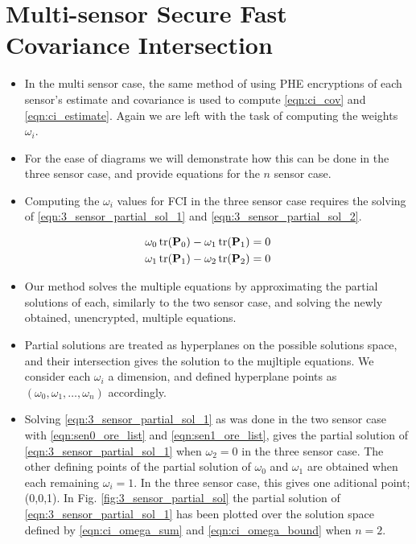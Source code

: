 \documentclass[letterpaper, 10 pt, conference]{ieeeconf}  %
\begin{document}
\section{Multi-sensor Secure Fast Covariance Intersection} \label{sec:multi_secfci}
\begin{itemize}
   \item In the multi sensor case, the same method of using PHE encryptions of each sensor's estimate and covariance is used to compute \eqref{eqn:ci_cov} and \eqref{eqn:ci_estimate}. Again we are left with the task of computing the weights $\omega_i$.
   \item For the ease of diagrams we will demonstrate how this can be done in the three sensor case, and provide equations for the $n$ sensor case.
   \item Computing the $\omega_i$ values for FCI in the three sensor case requires the solving of \eqref{eqn:3_sensor_partial_sol_1} and \eqref{eqn:3_sensor_partial_sol_2}.
\end{itemize}
\begin{gather}
   \omega_0 \operatorname{tr}({{\mathbf{P}}}_0) - \omega_1 \operatorname{tr}({{\mathbf{P}}}_1) = 0 \label{eqn:3_sensor_partial_sol_1}\\
   \omega_1 \operatorname{tr}({{\mathbf{P}}}_1) - \omega_2 \operatorname{tr}({{\mathbf{P}}}_2) = 0 \label{eqn:3_sensor_partial_sol_2}
\end{gather}
\begin{itemize}
   \item Our method solves the multiple equations by approximating the partial solutions of each, similarly to the two sensor case, and solving the newly obtained, unencrypted, multiple equations.
   \item Partial solutions are treated as hyperplanes on the possible solutions space, and their intersection gives the solution to the mujltiple equations. We consider each $\omega_i$ a dimension, and defined hyperplane points as $(\omega_0, \omega_1, \dots, \omega_n)$ accordingly.
   \item Solving \eqref{eqn:3_sensor_partial_sol_1} as was done in the two sensor case with \eqref{eqn:sen0_ore_list} and \eqref{eqn:sen1_ore_list}, gives the partial solution of \eqref{eqn:3_sensor_partial_sol_1} when $\omega_2=0$ in the three sensor case. The other defining points of the partial solution of $\omega_0$ and $\omega_1$ are obtained when each remaining $\omega_i=1$. In the three sensor case, this gives one aditional point; (0,0,1). In Fig. \ref{fig:3_sensor_partial_sol} the partial solution of \eqref{eqn:3_sensor_partial_sol_1} has been plotted over the solution space defined by \eqref{eqn:ci_omega_sum} and \eqref{eqn:ci_omega_bound} when $n=2$.
\end{itemize}
\end{document}
